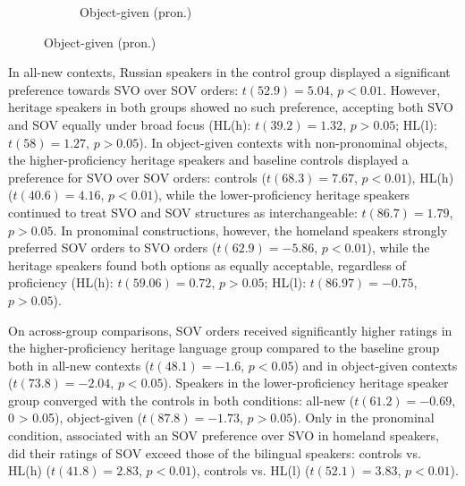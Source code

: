 \documentclass[output=paper]{langscibook}
\begin{document}
\begin{figure}
\begin{subfigure}[b]{.4\textwidth}
  \caption{Object-given (pron.)}
  \end{subfigure}
 \end{figure}

In all-new contexts, Russian speakers in the control group displayed a significant preference towards SVO over SOV orders: $t (52.9) = 5.04$, $p < 0.01$. However, heritage speakers in both groups showed no such preference, accepting both SVO and SOV equally under broad focus (HL(h): $t (39.2) = 1.32$, $p > 0.05$; HL(l): $t (58) = 1.27$, $p > 0.05$). In object-given contexts with non-pronominal objects, the higher-proficiency heritage speakers and baseline controls displayed a preference for SVO over SOV orders: controls ($t (68.3) = 7.67$, $p < 0.01$), HL(h) ($t (40.6) = 4.16$, $p < 0.01$), while the lower-proficiency heritage speakers continued to treat SVO and SOV structures as interchangeable: $t (86.7) = 1.79$, $p > 0.05$. In pronominal constructions, however, the homeland speakers strongly preferred SOV orders to SVO orders ($t (62.9) = -5.86$, $p < 0.01$), while the heritage speakers found both options as equally acceptable, regardless of proficiency (HL(h): $t (59.06) = 0.72$, $p > 0.05$; HL(l): $t (86.97) = -0.75$, $p > 0.05$).

On across-group comparisons, SOV orders received significantly higher ratings in the higher-proficiency heritage language group compared to the baseline group both in all-new contexts ($t(48.1) = -1.6$, $p < 0.05$) and in object-given contexts ($t(73.8) = -2.04$, $p < 0.05$). Speakers in the lower-proficiency heritage speaker group converged with the controls in both conditions: all-new ($t(61.2) = -0.69$, 0 > 0.05), object-given ($t(87.8) = -1.73$, $p > 0.05$). Only in the pronominal condition, associated with an SOV preference over SVO in homeland speakers, did their ratings of SOV exceed those of the bilingual speakers: controls vs. HL(h) ($t(41.8) = 2.83$, $p < 0.01$), controls vs. HL(l) ($t(52.1) = 3.83$, $p < 0.01$).  
\end{document}
